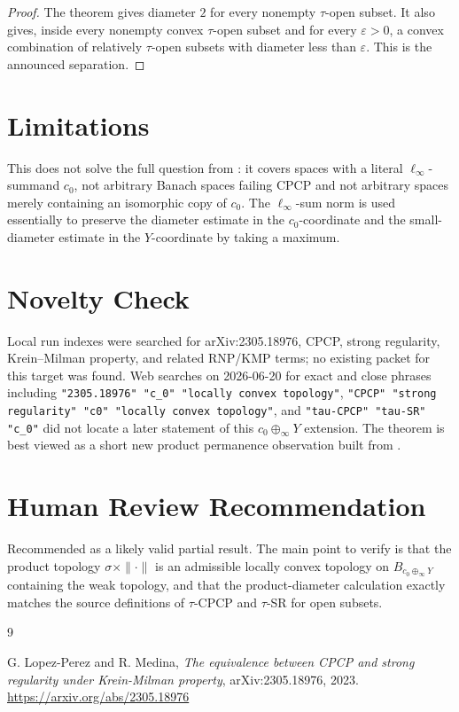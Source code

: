 \documentclass[11pt]{article}
\newcommand{\eps}{\varepsilon}
\newcommand{\cnull}{c_0}
\begin{document}
\begin{proof}
The theorem gives diameter \(2\) for every nonempty \(\tau\)-open subset. It
also gives, inside every nonempty convex \(\tau\)-open subset and for every
\(\eps>0\), a convex combination of relatively \(\tau\)-open subsets with
diameter less than \(\eps\). This is the announced separation.
\end{proof}

\section*{Limitations}

This does not solve the full question from \cite{LPM}: it covers spaces with a
literal \(\ell_\infty\)-summand \(\cnull\), not arbitrary Banach spaces failing
CPCP and not arbitrary spaces merely containing an isomorphic copy of \(c_0\).
The \(\ell_\infty\)-sum norm is used essentially to preserve the diameter
estimate in the \(c_0\)-coordinate and the small-diameter estimate in the
\(Y\)-coordinate by taking a maximum.

\section*{Novelty Check}

Local run indexes were searched for arXiv:2305.18976, CPCP, strong regularity,
Krein--Milman property, and related RNP/KMP terms; no existing packet for this
target was found. Web searches on 2026-06-20 for exact and close phrases
including \texttt{"2305.18976" "c\_0" "locally convex topology"},
\texttt{"CPCP" "strong regularity" "c0" "locally convex topology"}, and
\texttt{"tau-CPCP" "tau-SR" "c\_0"} did not locate a later statement of this
\(\cnull\oplus_\infty Y\) extension. The theorem is best viewed as a short
new product permanence observation built from \cite[Theorem 3.2]{LPM}.

\section*{Human Review Recommendation}

Recommended as a likely valid partial result. The main point to verify is that
the product topology \(\sigma\times\|\cdot\|\) is an admissible locally convex
topology on \(B_{\cnull\oplus_\infty Y}\) containing the weak topology, and
that the product-diameter calculation exactly matches the source definitions
of \(\tau\)-CPCP and \(\tau\)-SR for open subsets.

\begin{thebibliography}{9}

G. Lopez-Perez and R. Medina,
\emph{The equivalence between CPCP and strong regularity under Krein-Milman
property},
arXiv:2305.18976, 2023.
\url{https://arxiv.org/abs/2305.18976}

\end{thebibliography}
\end{document}
